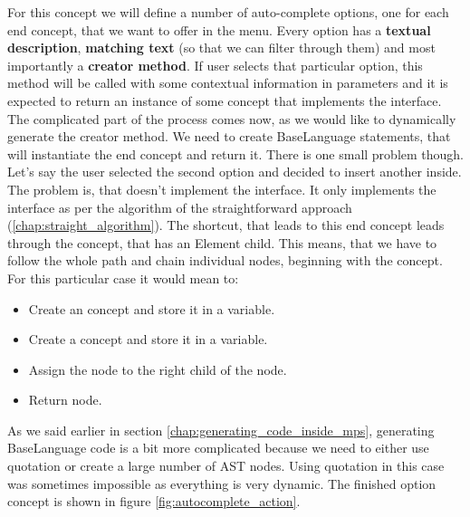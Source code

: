 For this concept we will define a number of auto-complete options, one for each end concept, that we want to offer in the menu.
Every option has a \textbf{textual description}, \textbf{matching text} (so that we can filter through them) and most importantly a \textbf{creator method}.
If user selects that particular option, this method will be called with some contextual information in parameters and it is expected to return an instance of some concept that implements the  interface.
\\

The complicated part of the process comes now, as we would like to dynamically generate the creator method.
We need to create BaseLanguage statements, that will instantiate the end concept and return it.
There is one small problem though.
Let's say the user selected the second option and decided to insert another  inside.
The problem is, that  doesn't implement the  interface.
It only implements the  interface as per the algorithm of the straightforward approach (\ref{chap:straight_algorithm}).
The shortcut, that leads to this end concept leads through the  concept, that has an Element child.
This means, that we have to follow the whole path and chain individual nodes, beginning with the  concept.
For this particular case it would mean to:

\begin{itemize}
	\item Create an  concept and store it in a variable.

	\item Create a  concept and store it in a variable.

	\item Assign the  node to the right child of the  node.

	\item Return  node.
\end{itemize}

As we said earlier in section \ref{chap:generating_code_inside_mps}, generating BaseLanguage code is a bit more complicated because we need to either use quotation or create a large number of AST nodes. Using quotation in this case was sometimes impossible as everything is very dynamic. The finished option concept is shown in figure \ref{fig:autocomplete_action}.

